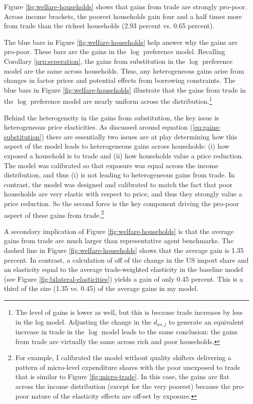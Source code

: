 \documentclass[12pt,pdftex]{article}
\begin{document}
\begin{onehalfspacing}
Figure \ref{fig:welfare-households} shows that gains from trade are strongly pro-poor. Across income brackets, the poorest households gain four and a half times more from trade than the richest households (2.93 percent vs. 0.65 percent). 

The blue bars in Figure \ref{fig:welfare-households} help answer why the gains are pro-poor. These bars are the gains in the $\log$ preference model. Recalling Corollary \ref{prp:seperation}, the gains from substitution in the $\log$ preference model are the same across households. Thus, any heterogeneous gains arise from changes in factor prices and potential effects from borrowing constraints. The blue bars in Figure \ref{fig:welfare-households} illustrate that the gains from trade in the $\log$ preference model are nearly uniform across the distribution.\footnote{The level of gains is lower as well, but this is because trade increases by less in the log model. Adjusting the change in the $d_{us,j}$ to generate an equivalent increase in trade in the $\log$ model leads to the same conclusion: the gains from trade are virtually the same across rich and poor households.}

Behind the heterogeneity in the gains from substitution, the key issue is heterogeneous price elasticities. As discussed around equation (\ref{eq:gains-substitution}) there are essentially two issues are at play determining how this aspect of the model leads to heterogeneous gains across households: (i) how exposed a household is to trade and (ii) how households value a price reduction. The model was calibrated so that exposure was equal across the income distribution, and thus (i) is not leading to heterogeneous gains from trade.  In contrast, the model was designed and calibrated to match the fact that poor households are very elastic with respect to price, and thus they strongly value a price reduction. So the second force is the key component driving the pro-poor aspect of these gains from trade.\footnote{For example, I calibrated the model without quality shifters delivering a pattern of micro-level expenditure shares with the poor unexposed to trade that is similar to Figure \ref{fig:micro-trade}. In this case, the gains are flat across the income distribution (except for the very poorest) because the pro-poor nature of the elasticity effects are off-set by exposure.}

A secondary implication of Figure \ref{fig:welfare-households} is that the average gains from trade are much larger than representative agent benchmarks. The dashed line in Figure \ref{fig:welfare-households} shows that the average gain is 1.35 percent. In contrast, a calculation of \citet{arkolakis2012new} off of the change in the US import share and an elasticity equal to the average trade-weighted elasticity in the baseline model (see Figure \ref{fig:bilateral-elasticities}) yields a gain of only 0.45 percent. This is a third of the size (1.35 vs. 0.45) of the average gains in my model.


\end{onehalfspacing}
\end{document}
